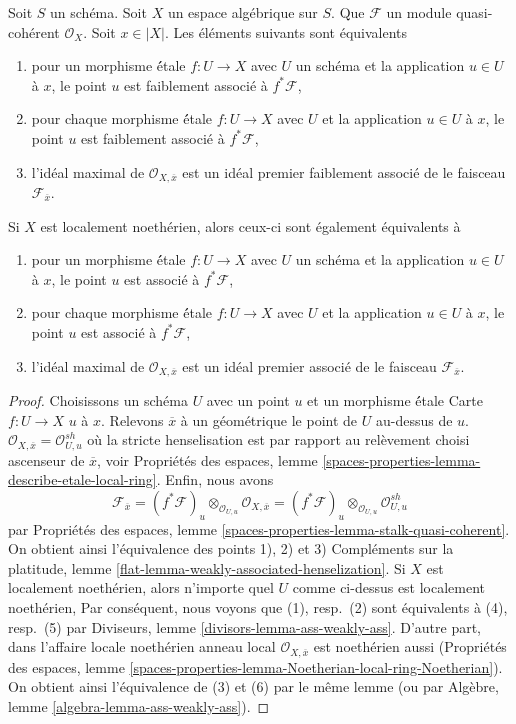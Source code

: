 \begin{lemma}
\label{lemma-associated}
Soit $S$ un schéma. Soit $X$ un espace algébrique sur $S$.
Que $\mathcal{F}$ un module quasi-cohérent $\mathcal{O}_X$.
Soit $x \in |X|$. Les éléments suivants sont équivalents
\begin{enumerate}
\item pour un morphisme \'étale $f : U \to X$ avec $U$ un schéma
et la application $u \in U$ à $x$, le point $u$ est faiblement associé
à $f^*\mathcal{F}$,
\item pour chaque morphisme \'étale $f : U \to X$ avec $U$
et la application $u \in U$ à $x$, le point $u$ est faiblement associé
à $f^*\mathcal{F}$,
\item l'idéal maximal de $\mathcal{O}_{X, \overline{x}}$
est un idéal premier faiblement associé de le faisceau $\mathcal{F}_{\overline{x}}$.
\end{enumerate}
Si $X$ est localement noethérien, alors ceux-ci sont également équivalents à
\begin{enumerate}
\item[(4)] pour un morphisme \'étale $f : U \to X$ avec $U$ un schéma
et la application $u \in U$ à $x$, le point $u$ est associé
à $f^*\mathcal{F}$,
\item[(5)] pour chaque morphisme \'étale $f : U \to X$ avec $U$
et la application $u \in U$ à $x$, le point $u$ est associé
à $f^*\mathcal{F}$,
\item[(6)] l'idéal maximal de $\mathcal{O}_{X, \overline{x}}$
est un idéal premier associé de le faisceau $\mathcal{F}_{\overline{x}}$.
\end{enumerate}
\end{lemma}

\begin{proof}
Choisissons un schéma $U$ avec un point $u$ et un morphisme \'étale
Carte $f : U \to X$ $u$ à $x$. Relevons $\overline{x}$ à un géométrique
le point de $U$ au-dessus de $u$.
$\mathcal{O}_{X, \overline{x}} = \mathcal{O}_{U, u}^{sh}$
où la stricte henselisation est par rapport au relèvement choisi
ascenseur de $\overline{x}$, voir
Propriétés des espaces, lemme
\ref{spaces-properties-lemma-describe-etale-local-ring}.
Enfin, nous avons
$$
\mathcal{F}_{\overline{x}} =
(f^*\mathcal{F})_u \otimes_{\mathcal{O}_{U, u}}
\mathcal{O}_{X, \overline{x}} =
(f^*\mathcal{F})_u \otimes_{\mathcal{O}_{U, u}}
\mathcal{O}_{U, u}^{sh}
$$
par
Propriétés des espaces, lemme \ref{spaces-properties-lemma-stalk-quasi-coherent}.
On obtient ainsi l'équivalence des points 1), 2) et 3)
Compléments sur la platitude, lemme \ref{flat-lemma-weakly-associated-henselization}.
Si $X$ est localement noethérien, alors
n'importe quel $U$ comme ci-dessus est localement noethérien,
Par conséquent, nous voyons que (1), resp.\ (2) sont équivalents à (4), resp.\ (5) par
Diviseurs, lemme \ref{divisors-lemma-ass-weakly-ass}.
D'autre part, dans l'affaire locale noethérien
anneau local $\mathcal{O}_{X, \overline{x}}$ est noethérien aussi
(Propriétés des espaces, lemme
\ref{spaces-properties-lemma-Noetherian-local-ring-Noetherian}).
On obtient ainsi l'équivalence de (3) et (6) par le même lemme
(ou par Algèbre, lemme \ref{algebra-lemma-ass-weakly-ass}).
\end{proof}


